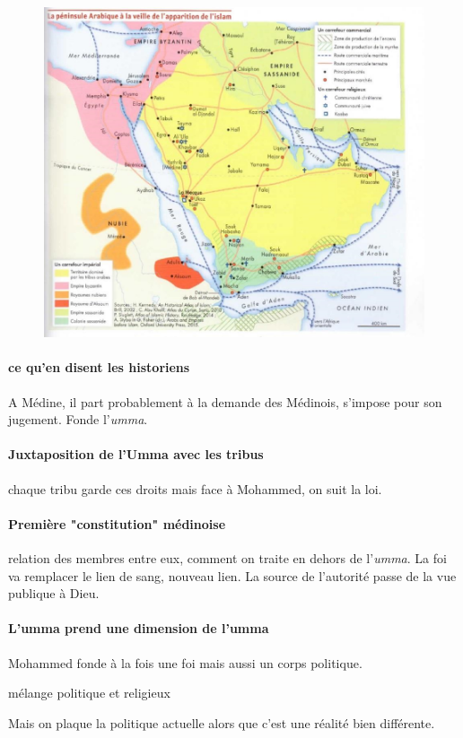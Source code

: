 \begin{figure}[h!]
    \centering
\includegraphics[width=\textwidth]{HistoireIslamMediterranee/Images/PeninsuleArabe.png}

    \label{fig:my_label}
\end{figure}


\paragraph{ce qu'en disent les historiens} A Médine, il part probablement à la demande des Médinois, s'impose pour son jugement. Fonde l'\textit{umma}. 

\paragraph{Juxtaposition de l'Umma avec les tribus} chaque tribu garde ces droits mais face à Mohammed, on suit la loi.

\paragraph{Première "constitution" médinoise} relation des membres entre eux, comment on traite en dehors de l'\textit{umma}. 
La foi va remplacer le lien de sang, nouveau lien. La source de l'autorité passe de la vue publique à Dieu.

\paragraph{L'umma prend une dimension de l'umma} Mohammed fonde à la fois une foi mais aussi un corps politique. 
\begin{Def}[théocratie]
    mélange politique et religieux
\end{Def}
Mais on plaque la politique actuelle alors que c'est une réalité bien différente.

